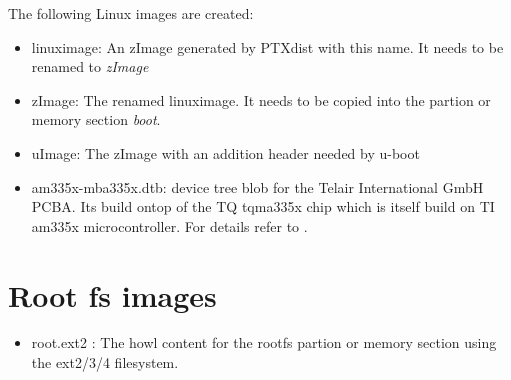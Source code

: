 The following Linux images are created:

\begin{itemize}
    \item linuximage: An zImage generated by PTXdist with this name. It needs to
        be renamed to \textit{zImage}
    \item zImage: The renamed linuximage. It needs to be copied into the
        partion or memory section \textit{boot}.
    \item uImage: The zImage with an addition header needed by u-boot
    \item am335x-mba335x.dtb: device tree blob for the Telair International GmbH
        PCBA. Its build ontop of the TQ tqma335x chip which is itself build on
        TI am335x microcontroller. For details refer to .
\end{itemize}


\section{Root fs images}%
\label{sec:Root fs imges}

\begin{itemize}
    \item root.ext2 : The howl content for the rootfs partion or memory section
    using the ext2/3/4 filesystem.
\end{itemize}
